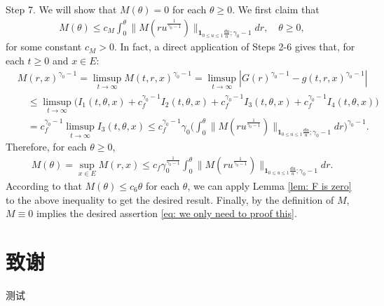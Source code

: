 \documentclass[UTF8]{pkuthss}
\theoremstyle{plain}
\theoremstyle{definition}
\numberwithin{equation}{section}
\begin{document}
	Step 7. We will show that $M(\theta) = 0$ for each $\theta \geq 0$.
	We first claim that
\begin{align}
	M(\theta)
	\leq c_M\int_0^\theta  \big\| M(r u^{\frac{1}{\gamma_0 - 1}}) \big\|_{\mathbf 1_{0\leq u\leq 1}\frac{du}{u};\gamma_0 - 1}  dr ,
	\quad \theta \geq 0,
\end{align}
	for some constant $c_M > 0$.
	In fact, a direct application of Steps 2-6 gives that, for each $t\geq 0$ and $x\in E$:
\begin{align}
	&M(r,x)^{\gamma_0 - 1}
	=\limsup_{t\to \infty} M(t,r,x)^{\gamma_0 - 1}
	= \limsup_{t\to \infty}|G(r)^{\gamma_0 - 1} - g(t,r,x)^{\gamma_0 - 1}|
	\\&\quad \leq \limsup_{t\to \infty} \big( I_1(t,\theta,x) +c^{\gamma_0 - 1}_f I_2(t,\theta,x) +c^{\gamma_0 - 1}_f I_3(t,\theta,x) + c^{\gamma_0 - 1}_f I_4(t,\theta,x) \big)
	\\& \quad = c_f^{\gamma_0 - 1} \limsup_{t\to \infty} I_3(t,\theta ,x)
	\leq c_f^{\gamma_0 - 1} \gamma_0 \Big(  \int_0^\theta  \big\| M(r u^{\frac{1}{\gamma_0 - 1}}) \big\|_{\mathbf 1_{0\leq u\leq 1}\frac{du}{u};\gamma_0 - 1}  dr\Big)^{\gamma_0 - 1}.
\end{align}
	Therefore, for each $\theta \geq 0$,
\begin{align}
	M(\theta)
	= \sup_{x\in E}  M(r,x)
	\leq c_f \gamma_0^{\frac{1}{\gamma_0 - 1}} \int_0^\theta  \big\| M(r u^{\frac{1}{\gamma_0 - 1}}) \big\|_{\mathbf 1_{0\leq u\leq 1}\frac{du}{u};\gamma_0 - 1}  dr.
\end{align}
	According to that $M(\theta) \leq c_6 \theta$ for each $\theta$, we can apply Lemma \ref{lem: F is zero} to the above inequality to get the desired result.
	Finally, by the definition of $M$,  $M\equiv 0$ implies the desired assertion \eqref{eq: we only need to proof this}.

\printbibliography[heading = bibintoc]
\backmatter
\chapter{致谢}	
	测试
	
\end{document}
